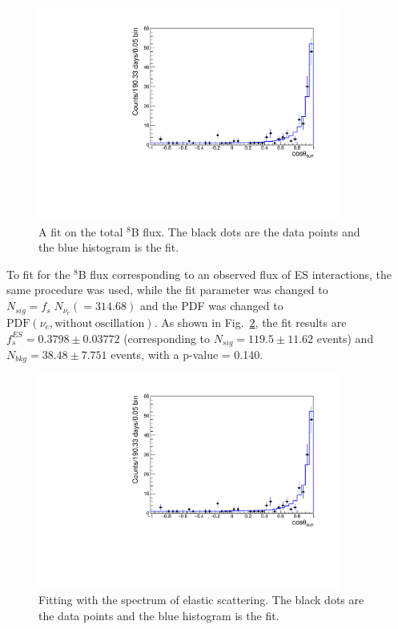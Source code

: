 \begin{figure}[!htb]
	\centering
	\includegraphics[width=10cm]{TotalFluxFit.pdf}
	\caption[A fit on the total $^8$B flux.]{A fit on the total $^8$B flux. The black dots are the data points and the blue histogram is the fit.}
	\label{fig:TOTALfluxFit}
\end{figure}

To fit for the $^8$B flux corresponding to an observed flux of ES interactions, the same procedure was used, while the fit parameter was changed to $N_{sig}=f_s \; N_{\nu_e}(=314.68)$ and the PDF was changed to $\mathrm{PDF}(\nu_e,\mathrm{without~oscillation})$. As shown in Fig.~\ref{fig:ESfluxFit}, the fit results are $f^{ES}_s=0.3798\pm 0.03772$ (corresponding to $N_{sig}=119.5\pm11.62$ events) and $N_{bkg}=38.48\pm 7.751$ events, with a p-value = 0.140.

\begin{figure}[!htb]
	\centering
	\includegraphics[width=10cm]{ESfluxFit.pdf}
	\caption[Fitting with the spectrum of elastic scattering.]{Fitting with the spectrum of elastic scattering. The black dots are the data points and the blue histogram is the fit.}
	\label{fig:ESfluxFit}
\end{figure}

